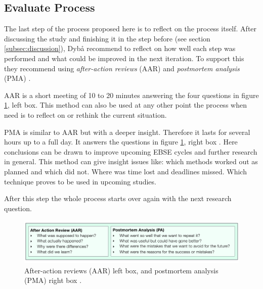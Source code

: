 
\subsection{Evaluate Process}
\label{subsec:evaluate process}

The last step of the process proposed here is to reflect on the process itself. After discussing the study and finishing it in the step before (see section \ref{subsec:discussion}), Dyb{\aa} \etal recommend to reflect on how well each step was performed and what could be improved in the next iteration. To support this they recommend using \emph{after-action reviews} (AAR) and \emph{postmortem analysis} (PMA) \cite{Dyba2005}.

AAR is a short meeting of 10 to 20 minutes answering the four questions in figure \ref{fig:aar_pma}, left box. This method can also be used at any other point the process when need is to reflect on or rethink the current situation\cite{Dyba2005}.

PMA is similar to AAR but with a deeper insight. Therefore it lasts for several hours up to a full day. It answers the questions in figure \ref{fig:aar_pma}, right box \cite{Dyba2005}. Here conclusions can be drawn to improve upcoming EBSE cycles and further research in general. This method can give insight issues like: which methods worked out as planned and which did not. Where was time lost and deadlines missed. Which technique proves to be used in upcoming studies. 

After this step the whole process starts over again with the next research question.

\begin{figure}
	\centering
	\includegraphics[width=12.5cm]{figures/aar_pma.pdf}
	\caption{After-action reviews (AAR) left box, and postmortem analysis (PMA) right box \cite{Dyba2005}.}
	\label{fig:aar_pma}
\end{figure}
